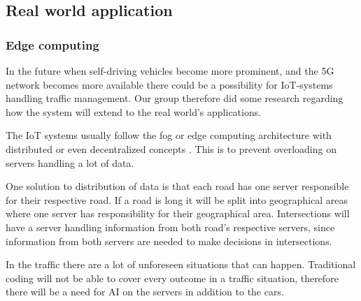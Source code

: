 \subsection{Real world application}
\subsubsection*{Edge computing}
In the future when self-driving vehicles become more prominent, and the 5G network becomes more available there could be a possibility for IoT-systems handling traffic management. Our group therefore did some research regarding how the system will extend to the real world’s applications. 

The IoT systems usually follow the fog or edge computing architecture with distributed or even decentralized concepts \parencite[pp 149]{iot_platforms}. This is to prevent overloading on servers handling a lot of data. 

One solution to distribution of data is that each road has one server responsible for their respective road. If a road is long it will be split into geographical areas where one server has responsibility for their geographical area. Intersections will have a server handling information from both road’s respective servers, since information from both servers are needed to make decisions in intersections.

In the traffic there are a lot of unforeseen situations that can happen. Traditional coding will not be able to cover every outcome in a traffic situation, therefore there will be a need for AI on the servers in addition to the cars. 